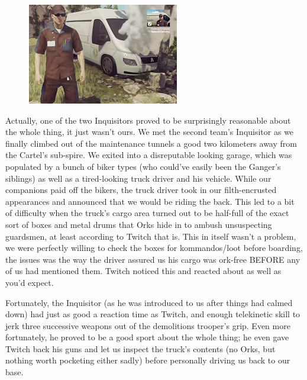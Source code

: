 \begin{figure}
	\begin{center}
		\includegraphics[width=\figwidth]{pics/18/42.png}
	\end{center}
\end{figure}
Actually, one of the two Inquisitors proved to be surprisingly reasonable about the whole thing, it just wasn't ours. 
We met the second team's Inquisitor as we finally climbed out of the maintenance tunnels a good two kilometers away from the Cartel's sub-spire. 
We exited into a disreputable looking garage, which was populated by a bunch of biker types (who could've easily been the Ganger's siblings) as well as a tired-looking truck driver and his vehicle. 
While our companions paid off the bikers, the truck driver took in our filth-encrusted appearances and announced that we would be riding the back. 
This led to a bit of difficulty when the truck's cargo area turned out to be half-full of the exact sort of boxes and metal drums that Orks hide in to ambush unsuspecting guardsmen, at least according to Twitch that is. 
This in itself wasn't a problem, we were perfectly willing to check the boxes for kommandos/loot before boarding, the issues was the way the driver assured us his cargo was ork-free BEFORE any of us had mentioned them. 
Twitch noticed this and reacted about as well as you'd expect.

Fortunately, the Inquisitor (as he was introduced to us after things had calmed down) had just as good a reaction time as Twitch, and enough telekinetic skill to jerk three successive weapons out of the demolitions trooper's grip. 
Even more fortunately, he proved to be a good sport about the whole thing; 
he even gave Twitch back his guns and let us inspect the truck's contents (no Orks, but nothing worth pocketing either sadly) before personally driving us back to our base.

